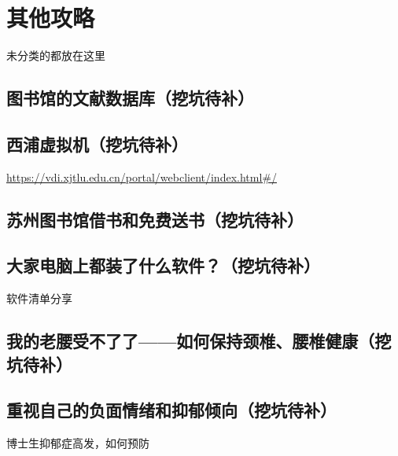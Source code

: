 
\chapter{其他攻略}

未分类的都放在这里



\section{图书馆的文献数据库（挖坑待补）}

\section{西浦虚拟机（挖坑待补）}
\url{https://vdi.xjtlu.edu.cn/portal/webclient/index.html#/}
\section{苏州图书馆借书和免费送书（挖坑待补）}
\section{大家电脑上都装了什么软件？（挖坑待补）}
软件清单分享
\section{我的老腰受不了了——如何保持颈椎、腰椎健康（挖坑待补）}
\section{重视自己的负面情绪和抑郁倾向（挖坑待补）}
博士生抑郁症高发，如何预防
